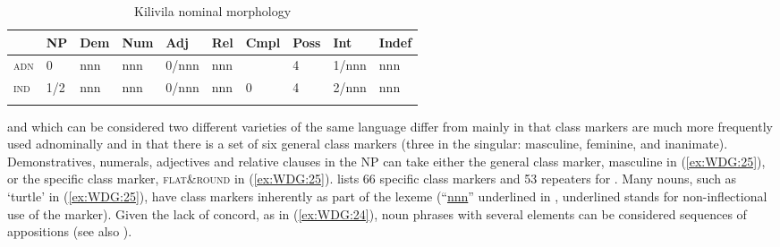 \documentclass[output=collectionpaper]{langsci/langscibook}
\begin{document}
%

\begin{table}
\caption{Kilivila nominal morphology}
\begin{tabular}{>{\scshape}l*{9}{l}}
  \lsptoprule
  &	NP	&	Dem	&	Num	&	Adj	&	Rel	&	Cmpl	&	Poss	&	Int	&	Indef	\\
\midrule
adn	&	0	&	nnn	&	nnn	&	0/nnn	&	nnn	&		&	4	&	1/nnn	&	nnn	\\
ind	&	1/2	&	nnn	&	nnn	&	0/nnn	&	nnn	&	0	&	4	&	2/nnn	&	nnn	\\
\lspbottomrule
\end{tabular}
\label{tab:WDG:6}
\end{table}

 and  \textendash{} which can be considered two different varieties of the same language \textendash{} differ from  mainly in that class markers are much more frequently used adnominally and in that there is a set of six general class markers (three in the singular: masculine, feminine, and inanimate). Demonstratives, numerals, adjectives and relative clauses in the NP can take either the general class marker, masculine in (\ref{ex:WDG:25}), or the specific class marker, \textsc{flat\&round} in (\ref{ex:WDG:25}). \cite[88--100]{Seifart2005} lists 66 specific class markers and 53 repeaters for . Many nouns, such as `turtle' in (\ref{ex:WDG:25}), have class markers inherently as part of the lexeme (``\uline{nnn}'' underlined in , underlined stands for non-inflectional use of the marker). Given the lack of concord, as in (\ref{ex:WDG:24}), noun phrases with several elements can be considered sequences of appositions (see also \citealt{Passer2016b}).

\begin{table}
\caption{Bora nominal morphology\label{tab:WDG:7}}
\end{table}
\end{document}

